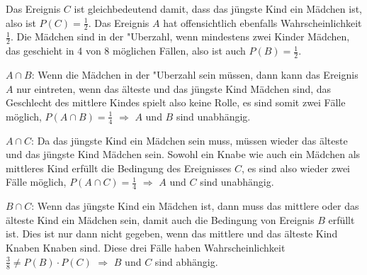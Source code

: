 \begin{loesung}
Das Ereignis $C$ ist gleichbedeutend damit, dass das jüngste
Kind ein Mädchen ist, also ist $P(C)=\frac12$. Das Ereignis $A$ hat
offensichtlich ebenfalls Wahrscheinlichkeit $\frac12$.
Die Mädchen sind in der "Uberzahl, wenn mindestens zwei Kinder Mädchen,
das geschieht in 4 von 8 möglichen Fällen, also ist auch $P(B)=\frac12$.

$A\cap B$: Wenn die Mädchen in der "Uberzahl sein müssen, dann kann
das Ereignis $A$ nur eintreten, wenn das älteste und das jüngste Kind
Mädchen sind, das Geschlecht des mittlere Kindes spielt also keine
Rolle, es sind somit zwei Fälle möglich, $P(A\cap B)=\frac14$
$\Rightarrow$
$A$ und $B$ sind unabhängig.

$A\cap C$: Da das jüngste Kind ein Mädchen sein muss, müssen wieder
das älteste und das jüngste Kind Mädchen sein. Sowohl ein Knabe
wie auch ein Mädchen als mittleres Kind erfüllt die Bedingung des
Ereignisses $C$, es sind also wieder zwei Fälle möglich, $P(A\cap C)=\frac14$
$\Rightarrow$
$A$ und $C$ sind unabhängig.

$B\cap C$: Wenn das jüngste Kind ein Mädchen ist, dann muss das mittlere
oder das älteste Kind ein Mädchen sein, damit auch die Bedingung von
Ereignis $B$ erfüllt ist. Dies ist nur dann nicht gegeben, wenn
das mittlere und das älteste Kind Knaben Knaben sind. Diese drei
Fälle haben Wahrscheinlichkeit $\frac38\ne P(B)\cdot P(C)$
$\Rightarrow$
$B$ und $C$ sind abhängig.
\end{loesung}

